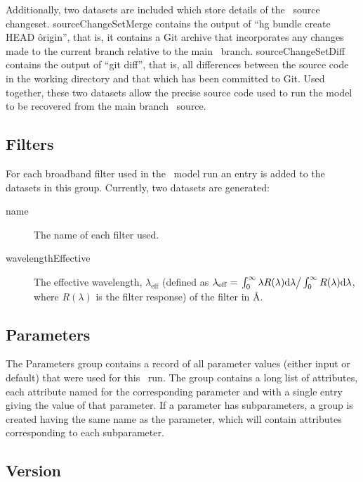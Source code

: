 Additionally, two datasets are included which store details of the \glc\ source changeset. {\normalfont \ttfamily sourceChangeSetMerge} contains the output of ``{\normalfont \ttfamily hg bundle create HEAD \^origin}'', that is, it contains a Git archive that incorporates any changes made to the current branch relative to the main \glc\ branch. {\normalfont \ttfamily sourceChangeSetDiff} contains the output of ``{\normalfont \ttfamily git diff}'', that is, all differences between the source code in the working directory and that which has been committed to Git. Used together, these two datasets allow the precise source code used to run the model to be recovered from the main branch \glc\ source.

\subsection{Filters}

For each broadband filter used in the \glc\ model run an entry is added to the datasets in this group. Currently, two datasets are generated:
\begin{description}
\item[{\normalfont \ttfamily name}] The name of each filter used.
\item[{\normalfont \ttfamily wavelengthEffective}] The effective wavelength, $\lambda_\mathrm{eff}$ (defined as $\lambda_\mathrm{eff}=\left. \int_0^\infty \lambda R(\lambda) \mathrm{d}\lambda \right/ \int_0^\infty R(\lambda) \mathrm{d}\lambda$, where $R(\lambda)$ is the filter response) of the filter in \AA.
\end{description}

\subsection{Parameters}

The {\normalfont \ttfamily Parameters} group contains a record of all parameter values (either input or default) that were used for this \glc\ run. The group contains a long list of attributes, each attribute named for the corresponding parameter and with a single entry giving the value of that parameter. If a parameter has subparameters, a group is created having the same name as the parameter, which will contain attributes corresponding to each subparameter.

\subsection{Version}

